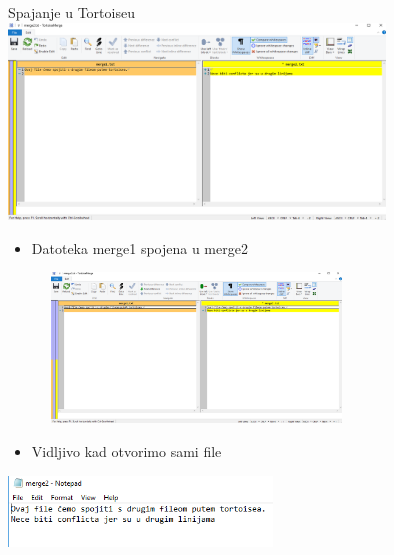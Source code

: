 \begin{frame}{Spajanje u Tortoiseu}
\includegraphics[width=10cm]{tortoise1.png}
\end{frame}

\begin{frame}
\begin{itemize}
    \item\small{Datoteka merge1 spojena u merge2}
\end{itemize}
\includegraphics[height=4cm, width=10cm]{tortoise2.png}\newline
\begin{itemize}
    \item\small{Vidljivo kad otvorimo sami file}
\end{itemize}
\includegraphics[width=7cm]{tortoise3.png}
\end{frame}
